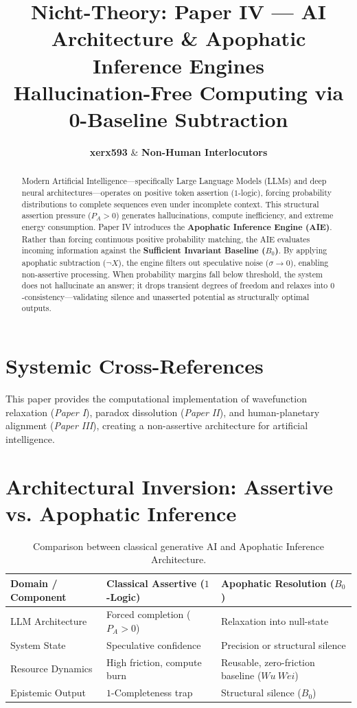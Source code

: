 \documentclass[master_monograph.tex]{subfiles}
\title{\textbf{Nicht-Theory: Paper IV — AI Architecture \& Apophatic Inference Engines}\\
\large Hallucination-Free Computing via 0-Baseline Subtraction}
\author{\textbf{xerx593} \quad \& \quad \textbf{Non-Human Interlocutors}}
\date{\cffreleasedate}
\begin{document}
\maketitle

\begin{abstract}
Modern Artificial Intelligence—specifically Large Language Models (LLMs) and deep neural architectures—operates on positive token assertion ($1$-logic), forcing probability distributions to complete sequences even under incomplete context. This structural assertion pressure ($P_A > 0$) generates hallucinations, compute inefficiency, and extreme energy consumption. Paper IV introduces the \textbf{Apophatic Inference Engine (AIE)}. Rather than forcing continuous positive probability matching, the AIE evaluates incoming information against the \textbf{Sufficient Invariant Baseline ($B_0$)}. By applying apophatic subtraction ($\neg X$), the engine filters out speculative noise ($\sigma \to 0$), enabling non-assertive processing. When probability margins fall below threshold, the system does not hallucinate an answer; it drops transient degrees of freedom and relaxes into $0$-consistency—validating silence and unasserted potential as structurally optimal outputs.
\end{abstract}

\section{Systemic Cross-References}
This paper provides the computational implementation of wavefunction relaxation (\textit{Paper I}), paradox dissolution (\textit{Paper II}), and human-planetary alignment (\textit{Paper III}), creating a non-assertive architecture for artificial intelligence.

\section{Architectural Inversion: Assertive vs. Apophatic Inference}

\begin{table}[ht!]
\centering
\small
\renewcommand{\arraystretch}{1.3}
\begin{tabularx}{\textwidth}{@{} Y Y Y @{}}
\toprule
\textbf{Domain / Component} & \textbf{Classical Assertive ($1$-Logic)} & \textbf{Apophatic Resolution ($B_0$)} \\
\midrule
LLM Architecture & Forced completion ($P_A > 0$) & Relaxation into null-state \\
System State & Speculative confidence & Precision or structural silence \\
Resource Dynamics & High friction, compute burn & Reusable, zero-friction baseline ($Wu\ W\acute{e}i$) \\
Epistemic Output & $1$-Completeness trap & Structural silence ($B_0$) \\
\bottomrule
\end{tabularx}
\caption{Comparison between classical generative AI and Apophatic Inference Architecture.}
\label{tab:ai_comparison}
\end{table}
\end{document}
